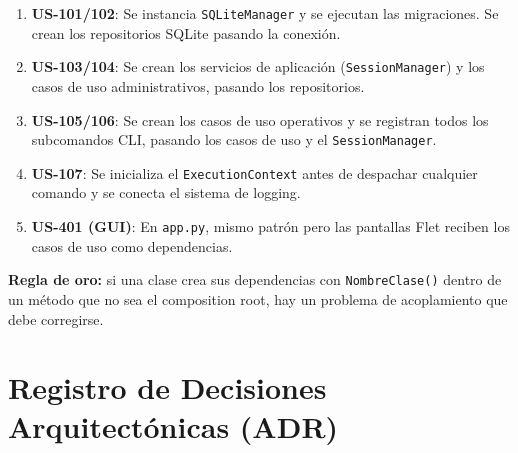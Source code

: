 \documentclass[11pt,a4paper]{article}
\newcommand{\fpath}[1]{\texttt{\small #1}}
\begin{document}
\begin{enumerate}[nosep]
  \item \textbf{US-101/102}: Se instancia \fpath{SQLiteManager} y se ejecutan las migraciones. Se crean los repositorios SQLite pasando la conexión.
  \item \textbf{US-103/104}: Se crean los servicios de aplicación (\fpath{SessionManager}) y los casos de uso administrativos, pasando los repositorios.
  \item \textbf{US-105/106}: Se crean los casos de uso operativos y se registran todos los subcomandos CLI, pasando los casos de uso y el \fpath{SessionManager}.
  \item \textbf{US-107}: Se inicializa el \fpath{ExecutionContext} antes de despachar cualquier comando y se conecta el sistema de logging.
  \item \textbf{US-401 (GUI)}: En \fpath{app.py}, mismo patrón pero las pantallas Flet reciben los casos de uso como dependencias.
\end{enumerate}

\textbf{Regla de oro:} si una clase crea sus dependencias con \fpath{NombreClase()} dentro de un método que no sea el composition root, hay un problema de acoplamiento que debe corregirse.

\section{Registro de Decisiones Arquitectónicas (ADR)}
\end{document}

